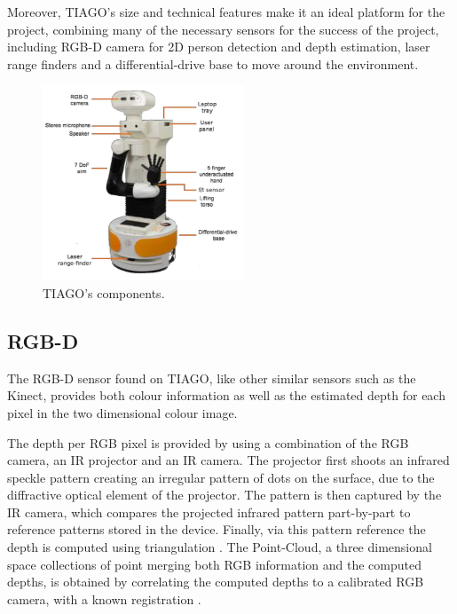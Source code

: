Moreover, TIAGO's size and technical features make it an ideal platform for the project, combining many of the necessary sensors for the success of the project, including RGB-D camera for 2D person detection and depth estimation, laser range finders and a differential-drive base to move around the environment.

\begin{figure}[H]
  \begin{center}
  	\includegraphics[width=6cm]{images/tiago_components.png}
  \end{center}
  \caption{TIAGO's components\protect\footnotemark.}
\end{figure}

\subsection{RGB-D}

The RGB-D sensor found on TIAGO, like other similar sensors such as the Kinect, provides both colour information as well as the estimated depth for each pixel in the two dimensional colour image.

The depth per RGB pixel is provided by using a combination of the RGB camera, an IR projector and an IR camera. The projector first shoots an infrared speckle pattern creating an irregular pattern of dots on the surface, due to the diffractive optical element of the projector. The pattern is then captured by the IR camera, which compares the projected infrared pattern part-by-part to reference patterns stored in the device. Finally, via this pattern reference the depth is computed using triangulation \cite{paper:RGB-D}. The Point-Cloud, a three dimensional space collections of point merging both RGB information and the computed depths, is obtained by correlating the computed depths to a calibrated RGB camera, with a known registration \cite{paper:RGB-D}.

